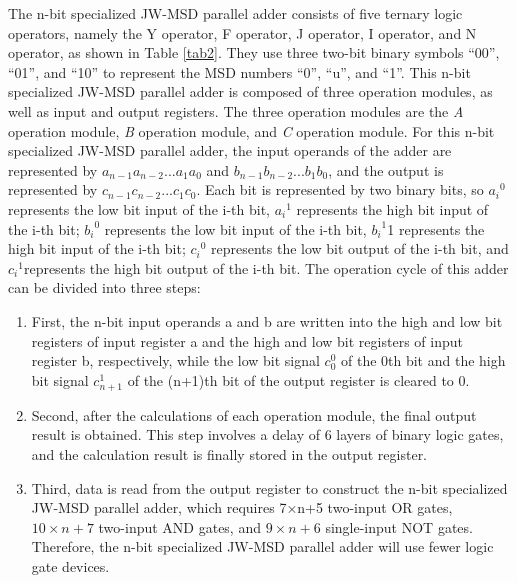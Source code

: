 \documentclass[electronics,article,accept,pdftex,moreauthors]{Definitions/mdpi}
\begin{document}
The n-bit specialized JW-MSD parallel adder consists of five ternary logic operators, namely the Y operator, F operator, J operator, I operator, and N operator, as shown in Table \ref{tab2}. They use three two-bit binary symbols “00”, “01”, and “10” to represent the MSD numbers “0”, “u”, and “1”. This n-bit specialized JW-MSD parallel adder is composed of three operation modules, as well as input and output registers. The three operation modules are the\textit{ A} operation module, \textit{B} operation module, and \textit{C} operation module. For this n-bit specialized JW-MSD parallel adder, the input operands of the adder are represented by $a_{n-1} a_{n-2}...a_1 a_0$ and $b_{n-1} b_{n-2}...b_1 b_0$, and the output is represented by $c_{n-1} c_{n-2}...c_1 c_0$. Each bit is represented by two binary bits, so ${a_i}^0$ represents the low bit input of the i-th bit, ${a_i}^1$ represents the high bit input of the i-th bit; ${b_i}^0$ represents the low bit input of the i-th bit, ${b_i}^1$1 represents the high bit input of the i-th bit; ${c_i}^0$ represents the low bit output of the i-th bit, and ${c_i}^1$represents the high bit output of the i-th bit. The operation cycle of this adder can be divided into three steps:

\begin{enumerate}[label={\arabic*).}]
\item  First, the n-bit input operands a and b are written into the high and low bit registers of input register a and the high and low bit registers of input register b, respectively, while the low bit signal $c_0^0$ of the 0th bit and the high bit signal $c_{n+1}^1$ of the (n+1)th bit of the output register is cleared to 0.
\item Second, after the calculations of each operation module, the final output result is obtained. This step involves a delay of 6 layers of binary logic gates, and the calculation result is finally stored in the output register.
\item  Third, data is read from the output register to construct the n-bit specialized JW-MSD parallel adder, which requires 7×n+5 two-input OR gates, $10 \times n+7$ two-input AND gates, and $9 \times n+6$ single-input NOT gates. Therefore, the n-bit specialized JW-MSD parallel adder will use fewer logic gate devices.
\end{enumerate}
\end{document}
